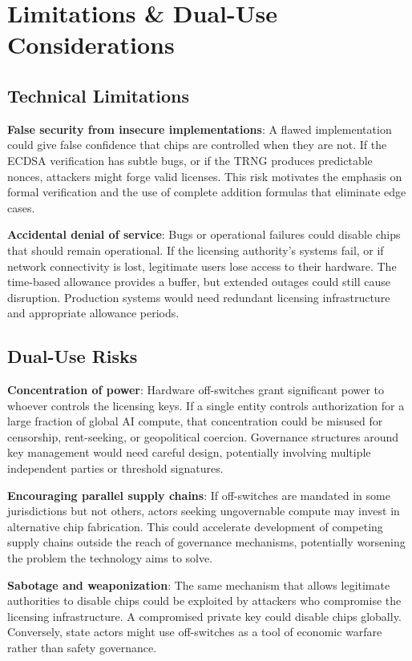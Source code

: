 \documentclass[11pt]{article}
\begin{document}
\appendix

\section{Limitations \& Dual-Use Considerations}

\subsection{Technical Limitations}

\textbf{False security from insecure implementations}: A flawed implementation could give false confidence that chips are controlled when they are not. If the ECDSA verification has subtle bugs, or if the TRNG produces predictable nonces, attackers might forge valid licenses. This risk motivates the emphasis on formal verification and the use of complete addition formulas that eliminate edge cases.

\textbf{Accidental denial of service}: Bugs or operational failures could disable chips that should remain operational. If the licensing authority's systems fail, or if network connectivity is lost, legitimate users lose access to their hardware. The time-based allowance provides a buffer, but extended outages could still cause disruption. Production systems would need redundant licensing infrastructure and appropriate allowance periods.

\subsection{Dual-Use Risks}

\textbf{Concentration of power}: Hardware off-switches grant significant power to whoever controls the licensing keys. If a single entity controls authorization for a large fraction of global AI compute, that concentration could be misused for censorship, rent-seeking, or geopolitical coercion. Governance structures around key management would need careful design, potentially involving multiple independent parties or threshold signatures.

\textbf{Encouraging parallel supply chains}: If off-switches are mandated in some jurisdictions but not others, actors seeking ungovernable compute may invest in alternative chip fabrication. This could accelerate development of competing supply chains outside the reach of governance mechanisms, potentially worsening the problem the technology aims to solve.

\textbf{Sabotage and weaponization}: The same mechanism that allows legitimate authorities to disable chips could be exploited by attackers who compromise the licensing infrastructure. A compromised private key could disable chips globally. Conversely, state actors might use off-switches as a tool of economic warfare rather than safety governance.
\end{document}
